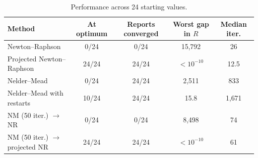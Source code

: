 \documentclass[11pt]{article}
\begin{document}
\begin{table}[H]
  \centering
  \caption{Performance across 24 starting values.}
  \label{tab:methods}
  \small
  \begin{tabular}{lcccc}
    \toprule
    Method & At optimum & Reports converged & Worst gap in $R$ & Median iter. \\
    \midrule
    Newton--Raphson                    & 0/24  & 0/24  & 15{,}792 & 26 \\
    Projected Newton--Raphson          & 24/24 & 24/24 & $<10^{-10}$ & 12.5 \\
    Nelder--Mead                       & 0/24  & 24/24 & 2{,}511  & 833 \\
    Nelder--Mead with restarts         & 10/24 & 24/24 & 15.8     & 1{,}671 \\
    NM (50 iter.) $\to$ NR             & 0/24  & 0/24  & 8{,}498  & 74 \\
    NM (50 iter.) $\to$ projected NR   & 24/24 & 24/24 & $<10^{-10}$ & 61 \\
    \bottomrule
  \end{tabular}
\end{table}
\end{document}
